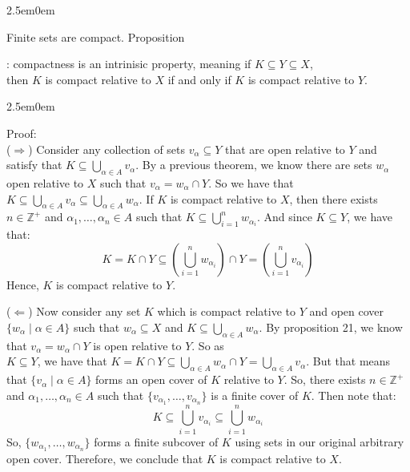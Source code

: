 \documentclass{book}
\newcommand{\hTwo}{%
   \color{MidnightBlue}%
   \fontsize{13}{15}\selectfont%
}
\newcommand{\hThree}{%
   \color{PineGreen}
   \fontsize{13}{15}\selectfont%
}
\newenvironment{myIndent}{%
   \begin{adjustwidth}{2.5em}{0em}%
}{%
   \end{adjustwidth}%
}
\newcommand{\uuline}[2][.]{%
{\vphantom{a}\color{#1}%
\rlap{\rule[-0.18em]{\widthof{#2}}{0.06em}}%
\rlap{\rule[-0.32em]{\widthof{#2}}{0.06em}}}%
#2}
\newcommand{\retTwo}{\hfill\bigbreak}
\newcounter{PropNumber}
\newcommand{\propCount}[1][1]{%
   \addtocounter{PropNumber}{#1}%
   \thePropNumber%
}
\begin{document}
   {\begin{myIndent} \hTwo
      Finite sets are compact. \retTwo
      Proposition \propCount: compactness is an \uuline{intrinisic} property, meaning if $K \subseteq Y \subseteq X$,\\ then $K$ is compact relative to $X$ if and only if $K$ is compact relative to $Y$.
      
      {\begin{myIndent} \hThree
         Proof:\\
         ($\Longrightarrow$) Consider any collection of sets $v_\alpha \subseteq Y$ that are open relative to $Y$ and satisfy that $K \subseteq {\displaystyle \bigcup_{\alpha \in A}{v_\alpha}}$. \retTwo
         By a previous theorem, we know there are sets $w_\alpha$  open relative to $X$ such that $v_\alpha = w_\alpha \cap Y$. So we have that $K \subseteq {\displaystyle \bigcup_{\alpha \in A}{v_\alpha}} \subseteq {\displaystyle \bigcup_{\alpha \in A}{w_\alpha}}$. \retTwo
         If $K$ is compact relative to $X$, then there exists $n \in \mathbb{Z}^+$ and $\alpha_1, \ldots, \alpha_n \in A$ such that $K \subseteq {\displaystyle \bigcup^n_{i=1}{w_{\alpha_i}}}$. And since $K \subseteq Y$, we have that:
         \[K = K \cap Y \subseteq \left(\bigcup^n_{i=1}{w_{\alpha_i}}\right)\cap Y = \left(\bigcup^n_{i=1}{v_{\alpha_i}}\right)\]
         Hence, $K$ is compact relative to $Y$.

         \newpage

         ($\Longleftarrow$) Now consider any set $K$ which is compact relative to $Y$ and open cover\\ $\{w_\alpha \mid \alpha \in A\}$ such that $w_\alpha \subseteq X$ and $K \subseteq {\displaystyle \bigcup_{\alpha \in A}{w_\alpha}}$. \retTwo By proposition 21, we know that $v_\alpha = w_\alpha \cap Y$ is open relative to $Y$. So as\\ $K \subseteq Y$, we have that $K = K \cap Y \subseteq {\displaystyle \bigcup_{\alpha \in A}{w_\alpha}} \cap Y = {\displaystyle \bigcup_{\alpha \in A}{v_\alpha}}$. \retTwo But that means that $\{v_\alpha \mid \alpha \in A\}$ forms an open cover of $K$ relative to $Y$. So, there exists $n \in \mathbb{Z}^+$ and $\alpha_1, \ldots, \alpha_n \in A$ such that $\{v_{\alpha_1}, \ldots, v_{\alpha_n}\}$ is a finite cover of $K$. Then note that:
         \[K \subseteq \bigcup^n_{i=1}{v_{\alpha_i}} \subseteq \bigcup^n_{i=1}{w_{\alpha_i}}\]
         So, $\{w_{\alpha_1}, \ldots, w_{\alpha_n}\}$ forms a finite subcover of $K$ using sets in our original arbitrary open cover. Therefore, we conclude that $K$ is compact relative to $X$. \retTwo
      \end{myIndent}}


\end{myIndent}}
\end{document}
